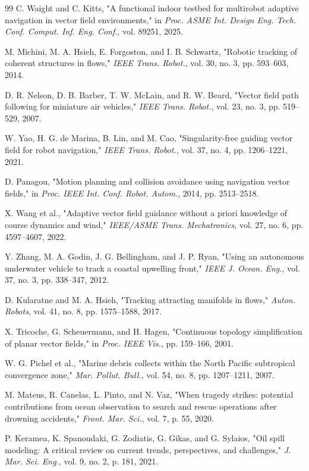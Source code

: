 \documentclass[lettersize,journal]{IEEEtran}
\begin{document}
\begin{thebibliography}{99}
 C. Waight and C. Kitts, "A functional indoor testbed for multirobot adaptive navigation in vector field environments," in \textit{Proc. ASME Int. Design Eng. Tech. Conf. Comput. Inf. Eng. Conf.}, vol. 89251, 2025.

 M. Michini, M. A. Hsieh, E. Forgoston, and I. B. Schwartz, "Robotic tracking of coherent structures in flows," \textit{IEEE Trans. Robot.}, vol. 30, no. 3, pp. 593--603, 2014.

 D. R. Nelson, D. B. Barber, T. W. McLain, and R. W. Beard, "Vector field path following for miniature air vehicles," \textit{IEEE Trans. Robot.}, vol. 23, no. 3, pp. 519--529, 2007.

 W. Yao, H. G. de Marina, B. Lin, and M. Cao, "Singularity-free guiding vector field for robot navigation," \textit{IEEE Trans. Robot.}, vol. 37, no. 4, pp. 1206--1221, 2021.

 D. Panagou, "Motion planning and collision avoidance using navigation vector fields," in \textit{Proc. IEEE Int. Conf. Robot. Autom.}, 2014, pp. 2513--2518.

 X. Wang et al., "Adaptive vector field guidance without a priori knowledge of course dynamics and wind," \textit{IEEE/ASME Trans. Mechatronics}, vol. 27, no. 6, pp. 4597--4607, 2022.

 Y. Zhang, M. A. Godin, J. G. Bellingham, and J. P. Ryan, "Using an autonomous underwater vehicle to track a coastal upwelling front," \textit{IEEE J. Ocean. Eng.}, vol. 37, no. 3, pp. 338--347, 2012.

 D. Kularatne and M. A. Hsieh, "Tracking attracting manifolds in flows," \textit{Auton. Robots}, vol. 41, no. 8, pp. 1575--1588, 2017.

 X. Tricoche, G. Scheuermann, and H. Hagen, "Continuous topology simplification of planar vector fields," in \textit{Proc. IEEE Vis.}, pp. 159--166, 2001.

 W. G. Pichel et al., "Marine debris collects within the North Pacific subtropical convergence zone," \textit{Mar. Pollut. Bull.}, vol. 54, no. 8, pp. 1207--1211, 2007.

 M. Mateus, R. Canelas, L. Pinto, and N. Vaz, "When tragedy strikes: potential contributions from ocean observation to search and rescue operations after drowning accidents," \textit{Front. Mar. Sci.}, vol. 7, p. 55, 2020.

 P. Keramea, K. Spanoudaki, G. Zodiatis, G. Gikas, and G. Sylaios, "Oil spill modeling: A critical review on current trends, perspectives, and challenges," \textit{J. Mar. Sci. Eng.}, vol. 9, no. 2, p. 181, 2021.


\end{thebibliography}
\end{document}
